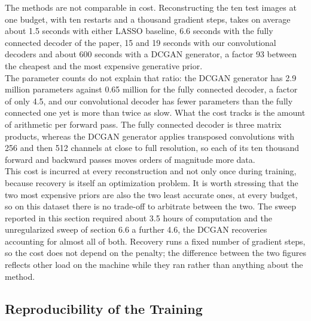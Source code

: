 The methods are not comparable in cost. Reconstructing the ten test images at one budget, with ten restarts and a thousand gradient steps, takes on average about 1.5 seconds with either LASSO baseline, 6.6 seconds with the fully connected decoder of the paper, 15 and 19 seconds with our convolutional decoders and about 600 seconds with a DCGAN generator, a factor 93 between the cheapest and the most expensive generative prior.
\\
The parameter counts do not explain that ratio: the DCGAN generator has 2.9 million parameters against 0.65 million for the fully connected decoder, a factor of only 4.5, and our convolutional decoder has fewer parameters than the fully connected one yet is more than twice as slow. What the cost tracks is the amount of arithmetic per forward pass. The fully connected decoder is three matrix products, whereas the DCGAN generator applies transposed convolutions with 256 and then 512 channels at close to full resolution, so each of its ten thousand forward and backward passes moves orders of magnitude more data.
\\
This cost is incurred at every reconstruction and not only once during training, because recovery is itself an optimization problem. It is worth stressing that the two most expensive priors are also the two least accurate ones, at every budget, so on this dataset there is no trade-off to arbitrate between the two. The sweep reported in this section required about 3.5 hours of computation and the unregularized sweep of section 6.6 a further 4.6, the DCGAN recoveries accounting for almost all of both. Recovery runs a fixed number of gradient steps, so the cost does not depend on the penalty; the difference between the two figures reflects other load on the machine while they ran rather than anything about the method.

\subsection{Reproducibility of the Training}


